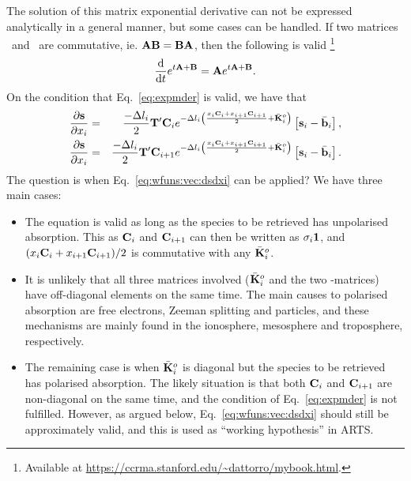 The solution of this matrix exponential derivative can not be expressed
analytically in a general  manner, but some cases can be handled. If two
matrices \ and \ are commutative, ie.
$\mathbf{A}\mathbf{B}=\mathbf{B}\mathbf{A}$, then the following is valid
\citep{Dattorro2011}\footnote{Available at
  \url{https://ccrma.stanford.edu/~dattorro/mybook.html}.}
\begin{equation}
  \label{eq:expmder}
  \frac{\mathrm{d}}{\mathrm{d} t} e^{t\mathbf{A}+\mathbf{B}} = 
       \mathbf{A}e^{t\mathbf{A}+\mathbf{B}}.
\end{equation}
On the condition that Eq.~\ref{eq:expmder} is valid, we have that
\begin{eqnarray}
  \label{eq:wfuns:vec:dsdxi}
  \frac{\partial{\bf s}}{\partial x_{i}} &=&  
  \frac{-\Delta l_{i}}{2} \mathbf{T}' \mathbf{C}_i
  e^{-\Delta l_{i}\left(\frac{x_{i}\mathbf{C}_i+
            x_{i+1}\mathbf{C}_{i+1}}{2} + \bar{{\bf K}}_i^o \right)}
   \left[ {\bf s}_{i}-\bar{{\bf b}}_i\right], \\
  \frac{\partial{\bf s}}{\partial x_{i}} &=&  
  \frac{-\Delta l_{i}}{2} \mathbf{T}' \mathbf{C}_{i+1}
  e^{-\Delta l_{i}\left(\frac{x_{i}\mathbf{C}_i+
            x_{i+1}\mathbf{C}_{i+1}}{2} + \bar{{\bf K}}_i^o \right)}
   \left[ {\bf s}_{i}-\bar{{\bf b}}_i\right]. \nonumber
\end{eqnarray}
The question is when Eq.~\ref{eq:wfuns:vec:dsdxi} can be applied? We have three
main cases:
\begin{itemize}
\item The equation is valid as long as the species to be retrieved has
  unpolarised absorption. This as $\mathbf{C}_i$ and $\mathbf{C}_{i+1}$ can
  then be written as $\sigma_i\mathbf{1}$, and
  $(x_{i}\mathbf{C}_i+x_{i+1}\mathbf{C}_{i+1})/2$ is commutative
  with any $\bar{{\bf K}}_i^o$.
\item It is unlikely that all three matrices involved ($\bar{{\bf K}}_i^o$ and
  the two -matrices) have off-diagonal elements on the same time. The
  main causes to polarised absorption are free electrons, Zeeman splitting and
  particles, and these mechanisms are mainly found in the ionosphere,
  mesosphere and troposphere, respectively.
\item The remaining case is when $\bar{{\bf K}}_i^o$ is diagonal but the
  species to be retrieved has polarised absorption. The likely situation is
  that both $\mathbf{C}_i$ and $\mathbf{C}_{i+1}$ are non-diagonal on the same
  time, and the condition of Eq.~\ref{eq:expmder} is not fulfilled. However, as
  argued below, Eq.~\ref{eq:wfuns:vec:dsdxi} should still be approximately
  valid, and this is used as ``working hypothesis'' in ARTS.
\end{itemize}
